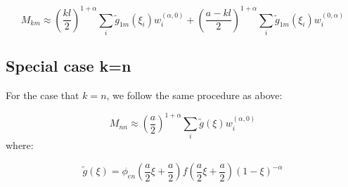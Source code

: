 \documentclass{article}
\begin{document}
\begin{equation}
    M_{km} \approx \left(\frac{kl}{2}\right)^{1+\alpha} \sum_{i}\tilde g_{1m}(\xi_i) w_i^{(\alpha,0)}+ \left(\frac{a-kl}{2}\right)^{1 + \alpha} \sum_i\tilde g_{1m}(\xi_i) w_i^{(0,\alpha)}
\end{equation}

\subsection*{Special case k=n}

For the case that $k=n$, we follow the same procedure as above:

\begin{equation}
    M_{nn} \approx \left(\frac{a}{2}\right)^{1+\alpha} \sum_i \tilde g(\xi) w_i^{(\alpha, 0)}
\end{equation}
where:

\begin{equation}
    \tilde g(\xi) = \phi_{en}\left(\frac{a}{2}\xi + \frac{a}{2}\right)f\left(\frac{a}{2}\xi + \frac{a}{2}\right)(1-\xi)^{-\alpha}
\end{equation}
\end{document}
